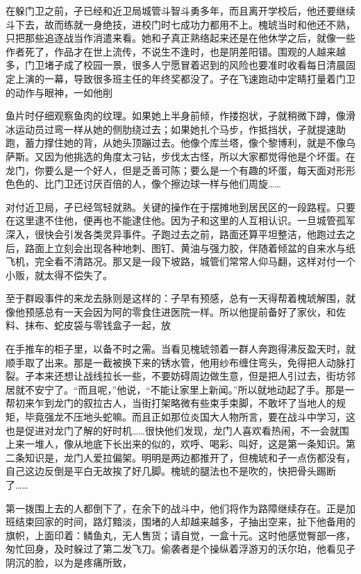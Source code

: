 \documentclass{article}
\begin{document}
在躲门卫之前，孑已经和近卫局城管斗智斗勇多年，而且离开学校后，他还要继续斗下去，故而练就一身绝技，进校门时七成功力都用不上。槐琥当时和他还不熟，只把那些追逐战当作消遣来看。她和孑真正熟络起来还是在他休学之后，就像一些作者死了，作品才在世上流传，不说生不逢时，也是阴差阳错。围观的人越来越多，门卫堵孑成了校园一景，很多人宁愿冒着迟到的风险也要准时收看每日清晨固定上演的一幕，导致很多班主任的年终奖都没了。孑在飞速跑动中定睛打量着门卫的动作与眼神，一如他削

\newpage 

鱼片时仔细观察鱼肉的纹理。如果她上半身前倾，作搂抱状，孑就稍微下蹲，像滑冰运动员过弯一样从她的侧肋绕过去；如果她扎个马步，作抵挡状，孑就提速助跑，蓄力撑住她的背，从她头顶蹦过去。他像个库兰塔，像个黎博利，就是不像乌萨斯。又因为他挑选的角度太刁钻，步伐太古怪，所以大家都觉得他是个坏蛋。在龙门，你要么是一个好人，但是乏善可陈；要么是一个有趣的坏蛋，每天面对形形色色的、比门卫还讨厌百倍的人，像个擦边球一样与他们周旋……

对付近卫局，孑已经驾轻就熟。关键的操作在于摆摊地到居民区的一段路程。只要在这里逮不住他，便再也不能逮住他。因为孑和这里的人互相认识。一旦城管孤军深入，很快会引发各类灵异事件。孑跑过去之前，路面还算平坦整洁，他跑过去之后，路面上立刻会出现各种地刺、图钉、黄油与强力胶，伴随着倾盆的自来水与纸飞机，完全看不清路况。那又是一段下坡路，城管们常常人仰马翻，这样对付一个小贩，就太得不偿失了。

至于群殴事件的来龙去脉则是这样的：孑早有预感，总有一天得帮着槐琥解围，就像他预感总有一天会因为阿的零食住进医院一样。所以他提前备好了家伙，和佐料、抹布、蛇皮袋与零钱盒子一起，放

\newpage 

在手推车的柜子里，以备不时之需。当看见槐琥领着一群人奔跑得沸反盈天时，就顺手取了出来。那是一截被换下来的锈水管，他用纱布缠住弯头，免得把人动脉打裂。孑本来还想让战线拉长一些，不要妨碍周边做生意，但是把人引过去，街坊邻居就不安宁了。“而且呢，”他说，“不能让家里上新闻。”所以就地动起了手。那是一帮初来乍到龙门的叙拉古人，当街打架略微有些束手束脚，不敢坏了当地人的规矩，毕竟强龙不压地头蛇嘛。而且正如那位炎国大人物所言，要在战斗中学习，这也是促进对龙门了解的好时机……很快他们发现，龙门人喜欢看热闹，不一会就围上来一堆人，像从地底下长出来的似的，欢呼、喝彩、叫好，这是第一条知识。第二条知识是，龙门人爱拉偏架。明明是两边都推开了，但槐琥和孑一点伤都没有，自己这边反倒是平白无故挨了好几脚。槐琥的腿法也不是吹的，快把骨头踢断了……

第一拨围上去的人都倒下了，在余下的战斗中，他们将作为路障继续存在。正是加班结束回家的时间，路灯黯淡，围堵的人却越来越多，孑抽出空来，扯下他备用的旗帜，上面印着：鳞鱼丸，无人售货；请自觉，一盒十元。这时他感觉臀部一疼，匆忙回身，及时躲过了第二发飞刀。偷袭者是个操纵着浮游刃的沃尔珀，他看见孑阴沉的脸，以为是疼痛所致，
\end{document}
